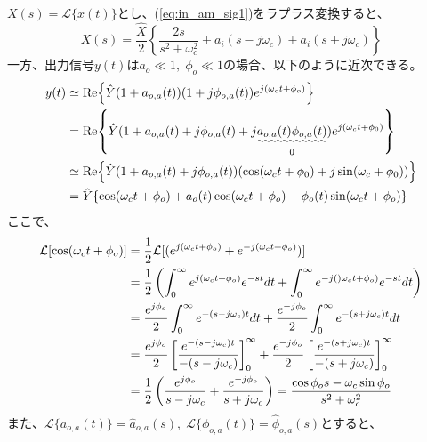 \documentclass[book]{jlreq}
\begin{document}
%
$X(s)=\mathcal{L}\{x(t)\}$とし、(\ref{eq:in_am_sig1})をラプラス変換すると、
%
\begin{equation}
    X(s) = \frac{\hat{X}}{2} \left \{\frac{2 s}{s^2 + \omega_c^2}
    + a_i(s - j\omega_c)+a_i(s+j\omega_c) \right \}
    \label{eq:lt_in_sig2}
\end{equation}
%
一方、出力信号$y(t)$は$a_o \ll 1,\; \phi_o \ll 1$の場合、以下のように近次できる。
%
\begin{align}
    y(t) & \simeq \Re{\hat{Y}(1+a_{o,a}(t))(1 + j\phi_{o,a}(t))e^{j(\omega_c t+\phi_o)}}\notag                        \\
         & = \Re{\hat{Y}(1 + a_{o,a}(t) + j\phi_{o,a}(t)
    + j\underset{0}{\uwave{a_{o,a}(t)\phi_{o,a}(t)}})e^{j(\omega_c t+\phi_0)}} \notag                                 \\
         & \simeq \Re{\hat{Y}(1+a_{o,a}(t)+j\phi_{o,a}(t))(\cos(\omega_c t + \phi_0)+j\sin(\omega_c + \phi_0))}\notag \\
         & = \hat{Y}\{\cos(\omega_c t+\phi_o)+a_o(t)\cos(\omega_c t+\phi_o) - \phi_o(t)\sin(\omega_c t + \phi_o)\}
    \label{eq:out_am_sig2}
\end{align}
%
ここで、
%
\begin{align}
    \mathcal{L} [\cos(\omega_c t + \phi_o)]
     & = \frac{1}{2}\mathcal{L}[(e^{j(\omega_c t+\phi_o)}+e^{-j(\omega_c t+\phi_o)})]\notag                                             \\
     & = \frac{1}{2}\left(\int_0^\infty e^{j(\omega_c t+\phi_o)} e^{-st} dt
    + \int_0^\infty e^{-j()\omega_c t+\phi_o)} e^{-st} dt \right)\notag                                                                 \\
     & = \frac{e^{j\phi_o}}{2}\int_0^\infty e^{-(s-j\omega_c) t} dt + \frac{e^{-j\phi_o}}{2}\int_0^\infty e^{-(s+j\omega_c) t} dt\notag \\
     & = \frac{e^{j\phi_o}}{2}\left[\frac{e^{-(s-j\omega_c) t}}{-(s-j\omega_c)}\right]_0^\infty
    +\frac{e^{-j\phi_o}}{2}\left[\frac{e^{-(s+j\omega_c) t}}{-(s+j\omega_c)}\right]_0^\infty\notag                                      \\
     & = \frac{1}{2}\left( \frac{e^{j\phi_o}}{s-j\omega_c}+\frac{e^{-j\phi_o}}{s+j\omega_c}\right)
    = \frac{\cos\phi_o s - \omega_c\sin\phi_o}{s^2+\omega_c^2}
\end{align}
%
また、$\mathcal{L}\{a_{o,a}(t)\} = \hat{a}_{o,a}(s),\; \mathcal{L}\{\phi_{o,a}(t)\} = \hat{\phi}_{o,a}(s)$とすると、
%
\end{document}
